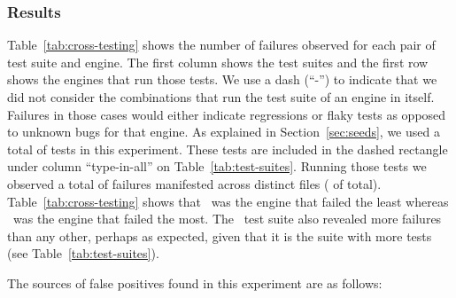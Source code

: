 \documentclass[smallextended]{svjour3}
\begin{document}
\subsubsection{Results}
\label{sec:results}

Table~\ref{tab:cross-testing} shows the number of failures observed
for each pair of test suite and engine. The first column shows the
test suites and the first row shows the engines that run those
tests. We use a dash (``-'') to indicate that we did not consider the
combinations that run the test suite of an engine in itself.  Failures
in those cases would either indicate regressions or flaky tests as
opposed to unknown bugs for that engine. As explained in
Section~\ref{sec:seeds}, we used a total of
\totalTestFilesForTestTransplantation{} tests in this
experiment. These tests are included in the dashed rectangle under
column ``type-in-all'' on Table~\ref{tab:test-suites}. Running those
tests we observed a total of \failuresTestTrans{} failures manifested
across \failuresTestTransDistictFiles{} distinct files
(\failuresTestTransPercent{} of total).  Table~\ref{tab:cross-testing}
shows that \smonkey\ was the engine that failed the least whereas
\chakra\ was the engine that failed the most. The \smonkey\ test suite
also revealed more failures than any other, perhaps as expected, given
that it is the suite with more tests (see
Table~\ref{tab:test-suites}).





\sloppy The sources of false positives found in this experiment are as
follows:
\end{document}
